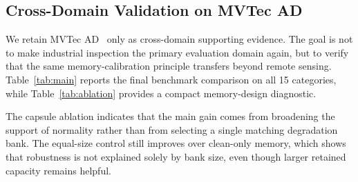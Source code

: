\documentclass[remotesensing,article,submit,pdftex,moreauthors]{Definitions/mdpi}
\begin{document}
\subsection{Cross-Domain Validation on MVTec AD}
We retain MVTec AD~\cite{mvtecad} only as cross-domain supporting evidence. The goal is not to make industrial inspection the primary evaluation domain again, but to verify that the same memory-calibration principle transfers beyond remote sensing. Table~\ref{tab:main} reports the final benchmark comparison on all 15 categories, while Table~\ref{tab:ablation} provides a compact memory-design diagnostic.

\begin{table}[!htbp]
\caption{Memory-design ablation on \textit{capsule}. Mixed degradation-enriched memory performs best, while the equal-size control shows that the gain is not explained only by a larger bank.}
\label{tab:ablation}
\centering
{}
\end{table}
\vspace{-4pt}

\noindent The capsule ablation indicates that the main gain comes from broadening the support of normality rather than from selecting a single matching degradation bank. The equal-size control still improves over clean-only memory, which shows that robustness is not explained solely by bank size, even though larger retained capacity remains helpful.
\end{document}
